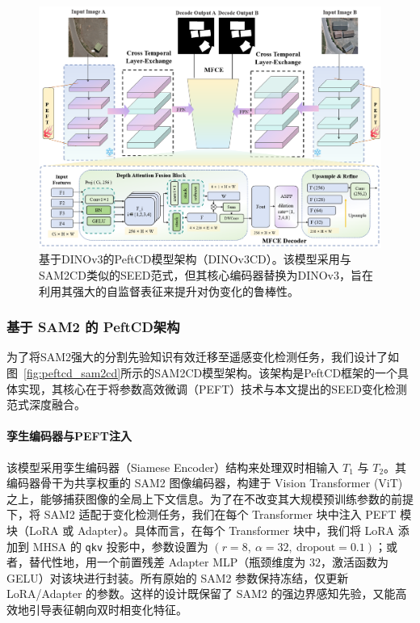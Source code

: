 \begin{figure}[!htbp]
  \centering
  \includegraphics[width=\textwidth]{paper_figures/基于AI基础模型微调的变化检测模型研究/PeftCD/peftcd_dino3cd.png} %
  \caption{基于DINOv3的PeftCD模型架构（DINOv3CD）。该模型采用与SAM2CD类似的SEED范式，但其核心编码器替换为DINOv3，旨在利用其强大的自监督表征来提升对伪变化的鲁棒性。}
  \label{fig:peftcd_dino3cd}
\end{figure}

\subsubsection{基于 SAM2 的 PeftCD架构}

为了将SAM2强大的分割先验知识有效迁移至遥感变化检测任务，我们设计了如图~\ref{fig:peftcd_sam2cd}所示的SAM2CD模型架构。该架构是PeftCD框架的一个具体实现，其核心在于将参数高效微调（PEFT）技术与本文提出的SEED变化检测范式深度融合。

\paragraph{孪生编码器与PEFT注入}
该模型采用孪生编码器（Siamese Encoder）结构来处理双时相输入 $T_1$ 与 $T_2$。其编码器骨干为共享权重的 SAM2 图像编码器，构建于 Vision Transformer (ViT) 之上，能够捕获图像的全局上下文信息。为了在不改变其大规模预训练参数的前提下，将 SAM2 适配于变化检测任务，我们在每个 Transformer 块中注入 PEFT 模块（LoRA 或 Adapter）。具体而言，在每个 Transformer 块中，我们将 LoRA 添加到 MHSA 的 \texttt{qkv} 投影中，参数设置为 $(r{=}8,\ \alpha{=}32,\ \text{dropout}{=}0.1)$；或者，替代性地，用一个前置残差 Adapter MLP（瓶颈维度为 $32$，激活函数为 GELU）对该块进行封装。所有原始的 SAM2 参数保持冻结，仅更新 LoRA/Adapter 的参数。这样的设计既保留了 SAM2 的强边界感知先验，又能高效地引导表征朝向双时相变化特征。  

